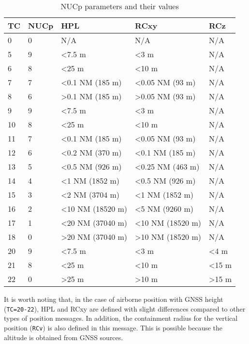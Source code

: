 \begin{table}[!ht]
\caption{NUCp parameters and their values}
\label{tb:nucp-params}
\begin{tabular}{|l|l|l|l|l|}
\hline
\textbf{TC} & \textbf{NUCp} & \textbf{HPL} & \textbf{RCxy} & \textbf{RCz} \\ \hline \hline
0 & 0 & N/A & N/A & N/A \\ \hline
5 & 9 & \textless 7.5 m & \textless 3 m & N/A \\ \hline
6 & 8 & \textless 25 m & \textless 10 m & N/A \\ \hline
7 & 7 & \textless 0.1 NM (185 m) & \textless 0.05 NM (93 m) & N/A \\ \hline
8 & 6 & \textgreater 0.1 NM (185 m) & \textgreater 0.05 NM (93 m) & N/A \\ \hline
\hline
9 & 9 & \textless 7.5 m & \textless 3 m & N/A \\ \hline
10 & 8 & \textless 25 m & \textless 10 m & N/A \\ \hline
11 & 7 & \textless 0.1 NM (185 m) & \textless 0.05 NM (93 m) & N/A \\ \hline
12 & 6 & \textless 0.2 NM (370 m) & \textless 0.1 NM (185 m) & N/A \\ \hline
13 & 5 & \textless 0.5 NM (926 m) & \textless 0.25 NM (463 m) & N/A \\ \hline
14 & 4 & \textless 1 NM (1852 m) & \textless 0.5 NM (926 m) & N/A \\ \hline
15 & 3 & \textless 2 NM (3704 m) & \textless 1 NM (1852 m) & N/A \\ \hline
16 & 2 & \textless 10 NM (18520 m) & \textless 5 NM (9260 m) & N/A \\ \hline
17 & 1 & \textless 20 NM (37040 m) & \textless 10 NM (18520 m) & N/A \\ \hline
18 & 0 & \textgreater 20 NM (37040 m) & \textgreater 10 NM (18520 m) & N/A \\ \hline
\hline
20 & 9 & \textless 7.5 m & \textless 3 m & \textless 4 m \\ \hline
21 & 8 & \textless 25 m & \textless 10 m & \textless 15 m \\ \hline
22 & 0 & \textgreater 25 m & \textgreater 10 m & \textgreater 15 m \\ \hline
\end{tabular}
\end{table}

It is worth noting that, in the case of airborne position with GNSS height (\texttt{TC=20-22}), HPL and RCxy are defined with slight differences compared to other types of position messages. In addition, the containment radius for the vertical position (\texttt{RCv}) is also defined in this message. This is possible because the altitude is obtained from GNSS sources.


